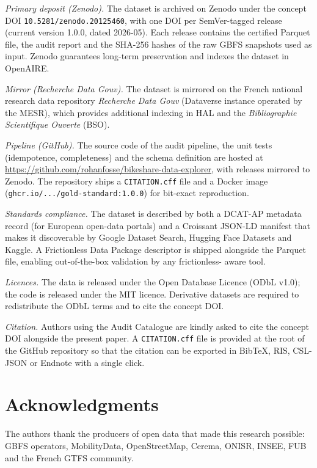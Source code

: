 \documentclass[a4paper,twoside]{article}
\begin{document}
\emph{Primary deposit (Zenodo).} The dataset is archived on
Zenodo under the concept DOI
\texttt{10.5281/zenodo.20125460}, with one DOI per
SemVer-tagged release (current version 1.0.0, dated 2026-05).
Each release contains the certified Parquet file, the audit
report and the SHA-256 hashes of the raw GBFS snapshots used as
input. Zenodo guarantees long-term preservation and indexes the
dataset in OpenAIRE.

\emph{Mirror (Recherche Data Gouv).} The dataset is mirrored on
the French national research data repository
\emph{Recherche Data Gouv} (Dataverse instance operated by the
MESR), which provides additional indexing in HAL and the
\emph{Bibliographie Scientifique Ouverte} (BSO).

\emph{Pipeline (GitHub).} The source code of the audit pipeline,
the unit tests (idempotence, completeness) and the schema
definition are hosted at
\url{https://github.com/rohanfosse/bikeshare-data-explorer},
with releases mirrored to Zenodo. The repository ships a
\texttt{CITATION.cff} file and a Docker image
(\texttt{ghcr.io/.../gold-standard:1.0.0}) for bit-exact
reproduction.

\emph{Standards compliance.} The dataset is described by both a
DCAT-AP metadata record \cite{DCATAP2021} (for European
open-data portals) and a Croissant JSON-LD manifest
\cite{Croissant2024} that makes it discoverable by
Google Dataset Search, Hugging Face Datasets and Kaggle.
A Frictionless Data Package descriptor
\cite{FrictionlessData2023} is shipped alongside the Parquet
file, enabling out-of-the-box validation by any frictionless-
aware tool.

\emph{Licences.} The data is released under the Open Database
Licence (ODbL v1.0); the code is released under the MIT
licence. Derivative datasets are required to redistribute the
ODbL terms and to cite the concept DOI.

\emph{Citation.} Authors using the Audit Catalogue are kindly
asked to cite the concept DOI alongside the present paper. A
\texttt{CITATION.cff} file is provided at the root of the
GitHub repository so that the citation can be exported in
BibTeX, RIS, CSL-JSON or Endnote with a single click.

\section*{Acknowledgments}
The authors thank the producers of open data that made this
research possible: GBFS operators, MobilityData, OpenStreetMap,
Cerema, ONISR, INSEE, FUB and the French GTFS community.
\end{document}
